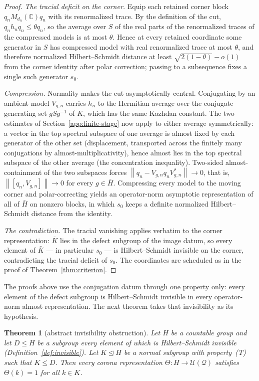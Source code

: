 \documentclass[11pt]{amsart}
\newcommand{\leanverified}[2]{\ignorespaces}
\newtheorem{theorem}{Theorem}[section]
\theoremstyle{definition}
\theoremstyle{remark}
\theoremstyle{plain}
\newcommand{\C}{\mathbb C}
\newcommand{\U}{\mathcal U}
\newcommand{\opnorm}[1]{\left\lVert #1\right\rVert}
\begin{document}
\begin{proof}
\emph{The tracial deficit on the corner.}  Equip each retained corner
block $q_nM_{d_n}(\C)q_n$ with its renormalized trace.  By the
definition of the cut, $q_nh_nq_n\le\theta q_n$, so the average over
$S$ of the real parts of the renormalized traces of the compressed
models is at most $\theta$.  Hence at every retained coordinate some
generator in $S$ has compressed model with real renormalized trace at
most $\theta$, and therefore normalized Hilbert--Schmidt distance at
least $\sqrt{2(1-\theta)}-o(1)$ from the corner identity after polar
correction; passing to a subsequence fixes a single such generator
$s_0$.

\emph{Compression.}  Normality makes the cut asymptotically central.
Conjugating by an ambient model $V_{g,n}$ carries $h_n$ to the
Hermitian average over the conjugate generating set $gSg^{-1}$ of
$\bar K$, which has the same Kazhdan constant.  The two estimates of
Section~\ref{app:finite-stage} now apply to either average
symmetrically: a vector in the top spectral subspace of one average is
almost fixed by each generator of the other set (displacement,
transported across the finitely many conjugations by
almost-multiplicativity), hence almost lies in the top spectral
subspace of the other average (the concentration inequality).
Two-sided almost-containment of the two subspaces forces
$\opnorm{q_n-V_{g,n}q_nV_{g,n}^{*}}\to0$, that is,
$\opnorm{[q_n,V_{g,n}]}\to0$ for every $g\in\bar H$.  Compressing
every model to the moving corner and polar-correcting yields an
operator-norm asymptotic representation of all of $\bar H$ on nonzero
blocks, in which $s_0$ keeps a definite normalized Hilbert--Schmidt
distance from the identity.

\emph{The contradiction.}  The tracial vanishing applies verbatim to the
corner representation: $\bar K$ lies in the defect subgroup of the
image datum, so every element of $\bar K$ --- in particular $s_0$ ---
is Hilbert--Schmidt invisible on the corner, contradicting the
tracial deficit of $s_0$.  The coordinates are scheduled as in the
proof of Theorem~\ref{thm:criterion}.
\end{proof}

The proofs above use the conjugation datum through one property only:
every element of the defect subgroup is Hilbert--Schmidt invisible in
every operator-norm almost representation.  The next theorem takes
that invisibility as its hypothesis.

\begin{theorem}[abstract invisibility obstruction]\label{thm:abstract-nk}
Let $H$ be a countable group and let $D\le H$ be a subgroup every
element of which is Hilbert--Schmidt invisible
(Definition~\ref{def:invisible}).  Let $K\trianglelefteq H$ be a normal subgroup with
property~\textup{(T)} such that $K\le D$.  Then every corona
representation $\Theta\colon H\to\U(\mathcal Q)$ satisfies
$\Theta(k)=1$ for all $k\in K$.
\leanverified{Sofic/ManuscriptExactWrappers}{GroupApproximation.ManuscriptExactWrappers.manuscriptAbstractNormalKazhdanObstruction}
\end{theorem}
\end{document}
